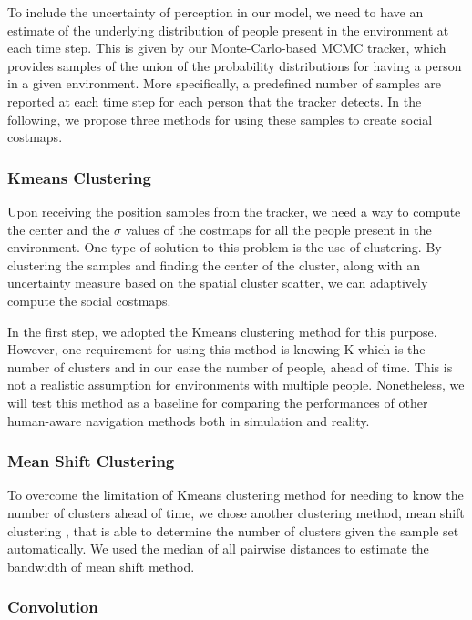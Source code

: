 To include the uncertainty of perception in our model, we need to have an estimate of the underlying distribution of people present in the environment at each time step. This is given by our Monte-Carlo-based MCMC tracker, which provides samples of the union of the probability distributions for having a person in a given environment. More specifically, a predefined number of samples are reported at each time step for each person that the tracker detects. In the following, we propose three methods for using these samples to create social costmaps.  



\subsubsection*{Kmeans Clustering}

Upon receiving the position samples from the tracker, we need a way to compute the center and the ${\sigma}$ values of the costmaps for all the people present in the environment. One type of solution to this problem is the use of clustering. By clustering the samples and finding the center of the cluster, along with an uncertainty measure based on the spatial cluster scatter, we can adaptively compute the social costmaps. 

In the first step, we adopted the Kmeans clustering \cite{hartigan1979algorithm} method for this purpose. However, one requirement for using this method is knowing K which is the number of clusters and in our case the number of people, ahead of time. This is not a realistic assumption for environments with multiple people. Nonetheless, we will test this method as a baseline for comparing the performances of other human-aware navigation methods both in simulation and reality.


\subsubsection*{Mean Shift Clustering}
To overcome the limitation of Kmeans clustering method for needing to know the number of clusters ahead of time, we chose another clustering method, mean shift clustering \cite{comaniciu2002mean}, that is able to determine the number of clusters given the sample set automatically. We used the median of all pairwise distances to estimate the bandwidth of mean shift method.



\subsubsection*{Convolution}

